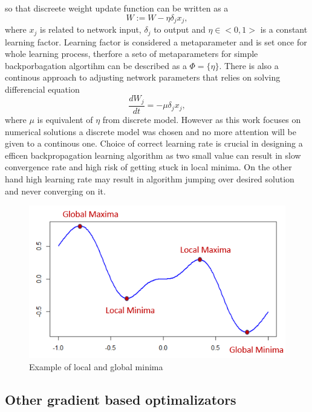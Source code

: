 so that discreete weight update function can be written as a 
\begin{equation}
	W := W - \eta \delta_{j} x_{j},
\end{equation}
where $x_{j}$ is related to network input,  $\delta_{j}$ to output and $\eta \in <0,1>$ is a 
constant learning factor.
Learning factor is considered a metaparameter and is set once for whole learning process, 
therfore a seto of metaparameters for simple backporbagation algortihm can be described as 
a $\Phi = \{\eta \}$. There is also a continous approach to adjusting network parameters that
relies on solving differencial equation
\begin{equation}
	\frac{dW_{j}}{dt} = -\mu \delta_{j} x_{j},
\end{equation}
where $\mu$ is equivalent of $\eta$ from discrete model. However as this work focuses on 
numerical solutions a discrete model was chosen and no more attention will be given to a 
continous one.
Choice of correct learning rate is crucial in designing a efficen backpropagation 
learning algorithm as two small value can result in slow convergence rate and high risk of 
getting stuck in local minima. On the other hand high learning rate may result in algorithm
jumping over desired solution and never converging on it. 
\begin{figure}[ht] 
	\centering
	\includegraphics[width=\textwidth]{res/local_minima}
	\caption{Example of local and global minima}
	\label{fig:local_minima}
\end{figure}

\subsection{Other gradient based optimalizators}
